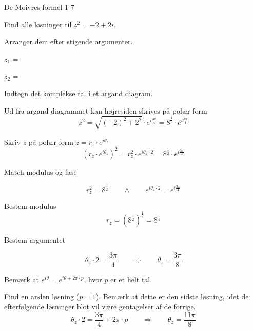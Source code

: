 \documentclass{article}
\begin{document}
\newpage

\begin{exercise}{De Moivres formel 1-7}

Find alle løsninger til $z^2=-2+2i$. 

Arranger dem efter stigende argumenter.

$z_1$ = 		

$z_2$ = 	

\hint 

Indtegn det komplekse tal i et argand diagram. 

\hint 

Ud fra argand diagrammet kan højresiden skrives på polær form
\[
z^2 = \sqrt{(-2)^2+2^2} \cdot e^{i \frac{3 \pi}{4}} = 8^{\frac{1}{2}} \cdot e^{i \frac{3 \pi}{4}} 
\]


\hint

Skriv $z$ på polær form $z = r_z \cdot e^{i \theta_z}$
\[
\left(r_z \cdot e^{i \theta_z}\right)^2 = r_z^2 \cdot e^{i \theta_z \cdot 2} = 8^{\frac{1}{2}} \cdot e^{i \frac{3 \pi}{4}} 
\]

\hint 
Match modulus og fase

\[
r_z^2 = 8^{\frac{1}{2}}  \qquad \wedge \qquad e^{i \theta_z \cdot 2} = e^{i \frac{3 \pi}{4}} 
\]

\hint

Bestem modulus
\[
r_z  =  \left(8^{\frac{1}{2}} \right)^{\frac{1}{2}} = 8^{\frac{1}{4}}
\]

\hint

Bestem argumentet

\[
\theta_z \cdot 2 = \frac{3 \pi}{4} \qquad \Rightarrow \qquad  \theta_z = \frac{3\pi}{8}
\]

\hint

Bemærk at $e^{i \theta} = e^{i \theta + 2 \pi \cdot p}$, hvor $p$ er et helt tal.

\hint

Find en anden løsning ($p=1$). 
Bemærk at dette er den sidste løsning, idet de efterfølgende 
løsninger blot vil være gentagelser af de forrige. 
\[
\theta_z \cdot 2 = \frac{3 \pi}{4}  + 2 \pi \cdot p \qquad \Rightarrow \qquad  \theta_z = \frac{11 \pi}{8}
\]


\end{exercise}

\newpage
\end{document}
